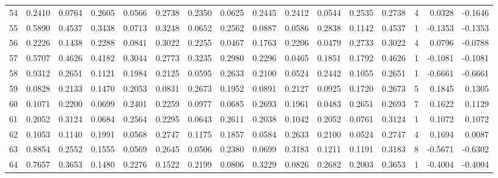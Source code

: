 \begin{tabular}{lrrrrrrrrrrrrrrr}
54  &      0.2410 &  0.0764 &  0.2605 &  0.0566 &  0.2738 &  0.2350 &  0.0625 &  0.2445 &  0.2412 &  0.0544 &   0.2535 &     0.2738 &      4 &                    0.0328 &                    -0.1646 \\
55  &      0.5890 &  0.4537 &  0.3438 &  0.0713 &  0.3248 &  0.0652 &  0.2562 &  0.0887 &  0.0586 &  0.2838 &   0.1142 &     0.4537 &      1 &                   -0.1353 &                    -0.1353 \\
56  &      0.2226 &  0.1438 &  0.2288 &  0.0841 &  0.3022 &  0.2255 &  0.0467 &  0.1763 &  0.2206 &  0.0479 &   0.2733 &     0.3022 &      4 &                    0.0796 &                    -0.0788 \\
57  &      0.5707 &  0.4626 &  0.4182 &  0.3044 &  0.2773 &  0.3235 &  0.2980 &  0.2296 &  0.0465 &  0.1851 &   0.1792 &     0.4626 &      1 &                   -0.1081 &                    -0.1081 \\
58  &      0.9312 &  0.2651 &  0.1121 &  0.1984 &  0.2125 &  0.0595 &  0.2633 &  0.2100 &  0.0524 &  0.2442 &   0.1055 &     0.2651 &      1 &                   -0.6661 &                    -0.6661 \\
59  &      0.0828 &  0.2133 &  0.1470 &  0.2053 &  0.0831 &  0.2673 &  0.1952 &  0.0891 &  0.2127 &  0.0925 &   0.1720 &     0.2673 &      5 &                    0.1845 &                     0.1305 \\
60  &      0.1071 &  0.2200 &  0.0699 &  0.2401 &  0.2259 &  0.0977 &  0.0685 &  0.2693 &  0.1961 &  0.0483 &   0.2651 &     0.2693 &      7 &                    0.1622 &                     0.1129 \\
61  &      0.2052 &  0.3124 &  0.0684 &  0.2564 &  0.2295 &  0.0643 &  0.2611 &  0.2038 &  0.1042 &  0.2052 &   0.0761 &     0.3124 &      1 &                    0.1072 &                     0.1072 \\
62  &      0.1053 &  0.1140 &  0.1991 &  0.0568 &  0.2747 &  0.1175 &  0.1857 &  0.0584 &  0.2633 &  0.2100 &   0.0524 &     0.2747 &      4 &                    0.1694 &                     0.0087 \\
63  &      0.8854 &  0.2552 &  0.1555 &  0.0569 &  0.2645 &  0.0506 &  0.2380 &  0.0699 &  0.3183 &  0.1211 &   0.1191 &     0.3183 &      8 &                   -0.5671 &                    -0.6302 \\
64  &      0.7657 &  0.3653 &  0.1480 &  0.2276 &  0.1522 &  0.2199 &  0.0806 &  0.3229 &  0.0826 &  0.2682 &   0.2003 &     0.3653 &      1 &                   -0.4004 &                    -0.4004 \\

\end{tabular}
